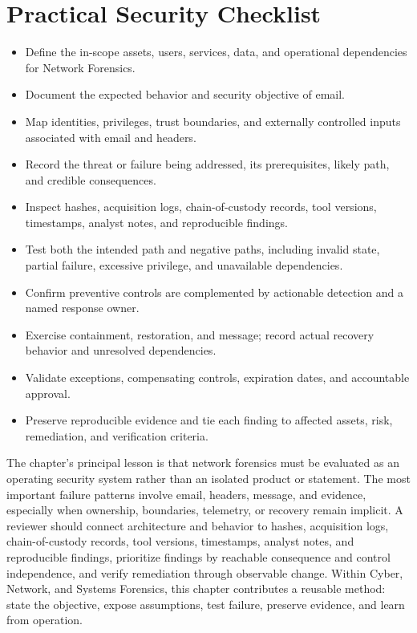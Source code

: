 \documentclass[11pt]{article}
\begin{document}
\section*{Practical Security Checklist}
\begin{itemize}[label=$\square$]
\item Define the in-scope assets, users, services, data, and operational dependencies for Network Forensics.
\item Document the expected behavior and security objective of email.
\item Map identities, privileges, trust boundaries, and externally controlled inputs associated with email and headers.
\item Record the threat or failure being addressed, its prerequisites, likely path, and credible consequences.
\item Inspect hashes, acquisition logs, chain-of-custody records, tool versions, timestamps, analyst notes, and reproducible findings.
\item Test both the intended path and negative paths, including invalid state, partial failure, excessive privilege, and unavailable dependencies.
\item Confirm preventive controls are complemented by actionable detection and a named response owner.
\item Exercise containment, restoration, and message; record actual recovery behavior and unresolved dependencies.
\item Validate exceptions, compensating controls, expiration dates, and accountable approval.
\item Preserve reproducible evidence and tie each finding to affected assets, risk, remediation, and verification criteria.
\end{itemize}
\begin{synthesisbox}
The chapter's principal lesson is that network forensics must be evaluated as an operating security system rather than an isolated product or statement. The most important failure patterns involve email, headers, message, and evidence, especially when ownership, boundaries, telemetry, or recovery remain implicit. A reviewer should connect architecture and behavior to hashes, acquisition logs, chain-of-custody records, tool versions, timestamps, analyst notes, and reproducible findings, prioritize findings by reachable consequence and control independence, and verify remediation through observable change. Within Cyber, Network, and Systems Forensics, this chapter contributes a reusable method: state the objective, expose assumptions, test failure, preserve evidence, and learn from operation.
\end{synthesisbox}
\end{document}
